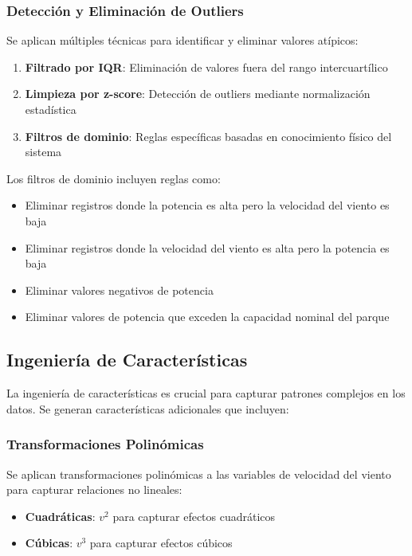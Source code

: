 \documentclass[conference]{IEEEtran}
\begin{document}
	\subsubsection{Detección y Eliminación de Outliers}
	Se aplican múltiples técnicas para identificar y eliminar valores atípicos:
	\begin{enumerate}
		\item \textbf{Filtrado por IQR}: Eliminación de valores fuera del rango intercuartílico
		\item \textbf{Limpieza por z-score}: Detección de outliers mediante normalización estadística
		\item \textbf{Filtros de dominio}: Reglas específicas basadas en conocimiento físico del sistema
	\end{enumerate}
	
	Los filtros de dominio incluyen reglas como:
	\begin{itemize}
		\item Eliminar registros donde la potencia es alta pero la velocidad del viento es baja
		\item Eliminar registros donde la velocidad del viento es alta pero la potencia es baja
		\item Eliminar valores negativos de potencia
		\item Eliminar valores de potencia que exceden la capacidad nominal del parque
	\end{itemize}
	
	\subsection{Ingeniería de Características}
	La ingeniería de características es crucial para capturar patrones complejos en los datos. Se generan características adicionales que incluyen:
	
	\subsubsection{Transformaciones Polinómicas}
	Se aplican transformaciones polinómicas a las variables de velocidad del viento para capturar relaciones no lineales:
	\begin{itemize}
		\item \textbf{Cuadráticas}: $v^2$ para capturar efectos cuadráticos
		\item \textbf{Cúbicas}: $v^3$ para capturar efectos cúbicos
	\end{itemize}
	
\end{document}
